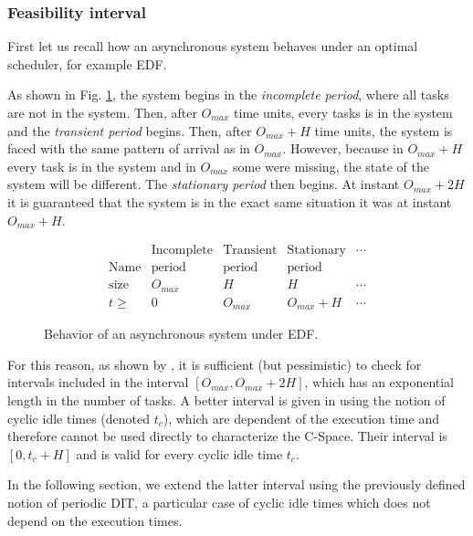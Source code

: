 \documentclass[conference]{IEEEtran}
\begin{document}
		\subsubsection{Feasibility interval}
			First let us recall how an asynchronous system behaves under an optimal
			scheduler, for example EDF.

			As shown in Fig. \ref{fig:asyncBehavior}, the system begins in the
			\emph{incomplete period}, where all tasks are not in the system. Then, after
			$O_{max}$ time units, every tasks is in the system and the \emph{transient
			period} begins. Then, after $O_{max} + H$ time units, the system is faced
			with the same pattern of arrival as in $O_{max}$. However, because in
			$O_{max} + H$ every task is in the system and in $O_{max}$ some were missing,
			the state of the system will be different. The \emph{stationary period} then
			begins. At instant $O_{max} + 2H$ it is guaranteed that the system is in the
			exact same situation it was at instant $O_{max} + H$.

			\begin{figure}[h]
				\[
					\begin{array}{r||c|c|c|l}
									& \text{Incomplete} & \text{Transient}	& \text{Stationary} & \cdots \\
						\text{Name} & \text{period} 	& \text{period} 	& \text{period}  	& \\ \hline
						\text{size} & O_{max} 			& H 				& H 				& \cdots \\ \hline
						t \geqslant & 0 				& O_{max} 			& O_{max} + H 		& \cdots
					\end{array}
				\]
				\begin{center}
				\caption{Behavior of an asynchronous system under EDF.}
				\label{fig:asyncBehavior}
				\end{center}
			\end{figure}

			For this reason, as shown by \cite{leung1982complexity}, it is sufficient (but pessimistic) to
			check for
			intervals included in the interval $[O_{max}, O_{max} + 2H]$, which has an exponential length
			in the number of tasks. A better interval is given in \cite{choquet2004minimal} using the
			notion of cyclic idle times (denoted $t_c$), which are dependent of the execution
			time and therefore cannot be used directly to characterize the C-Space. Their interval is $[0, t_c + H]$ and is valid for
			every cyclic idle time $t_c$.

			In the following section, we extend the latter interval using the previously defined notion
			of periodic DIT, a particular case of cyclic idle times which does not depend on the execution
			times.
\end{document}
